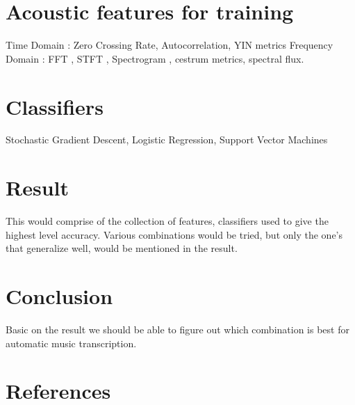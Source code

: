 \documentclass{article}
\begin{document}
\section{Acoustic features for training}\label{sec:features}
Time Domain : Zero Crossing Rate, Autocorrelation, YIN metrics Frequency Domain : FFT , STFT , Spectrogram , cestrum metrics, spectral flux.

\section{Classifiers}\label{sec:Classifiers}
Stochastic Gradient Descent, Logistic Regression, Support Vector Machines


\section{Result}\label{sec:Result}
This would comprise of the collection of features, classifiers used to give the highest level accuracy. Various combinations would be tried, but only the one's that generalize well, would be mentioned in the result. 

\section{Conclusion}\label{sec:Conclusion}
Basic on the result we should be able to figure out which combination is best for automatic music transcription.



\section{References}




%
%
%
%
\end{document}
